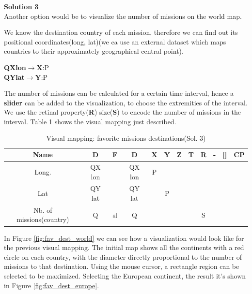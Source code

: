 \documentclass{article}
\begin{document}
\large{\textbf{Solution 3}\\}
Another option would be to visualize the number of missions on the world map.

We know the destination country of each mission, therefore we can find out its positional coordinates(long, lat)(we ca use an external dataset which maps countries to their approximately geographical central point).

\textbf{QXlon}$\rightarrow$\textbf{X}:P\\
\textbf{QYlat}$\rightarrow$\textbf{Y}:P

The number of missions can be calculated for a certain time interval, hence a \textbf{slider} can be added to the visualization, to choose the extremities of the interval. We use the retinal property(\textbf{R}) size(\textbf{S}) to encode the number of missions in the interval. Table \ref{table5} shows the visual mapping just described.

\begin{table}[h!]
	\begin{center}
		\begin{tabular}{|c | c | c | c || c | c | c | c | c| c| c || c|} 
			\hline
			Name & D & F & D\textquotesingle  & X & Y & Z & T & R & -& [] & CP \\ [0.5ex] 
			\hline\hline
			Long.  & QX lon &  & QX lon &  P &   &   &   &   &   &   &   \\ [0.5ex] 
			\hline
			Lat  & QY lat &  & QY lat &  & P  &   &   &   &   &   &   \\ [0.5ex] 
			\hline
			Nb. of missions(country)  & Q & sl & Q &  &   &   &   & S  &   &   &   \\ [0.5ex] 
			\hline
		\end{tabular}
		\caption{Visual mapping: favorite missions destinations(Sol. 3)}
		\label{table5}
	\end{center}
\end{table}

In Figure \ref{fig:fav_dest_world} we can see how a visualization would look like for the previous visual mapping. The initial map shows all the continents with a red circle on each country, with the diameter directly proportional to the number of missions to that destination. Using the mouse cursor, a rectangle region can be selected to be maximized. Selecting the European continent, the result it's shown in Figure \ref{fig:fav_dest_europe}.
\end{document}
